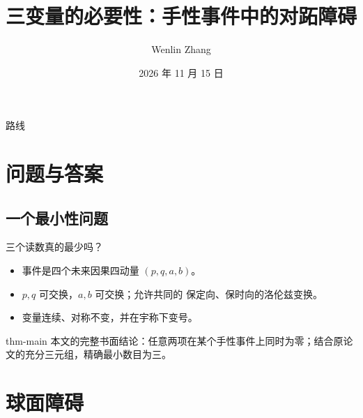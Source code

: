 \documentclass{beamer}
\title{三变量的必要性：手性事件中的对跖障碍}
\author{Wenlin Zhang}
\institute{National University of Singapore 与 Chrono AI，新加坡}
\date{2026 年 11 月 15 日}
\begin{document}
\begin{frame}
  \titlepage
\end{frame}
\begin{frame}{路线}
  \tableofcontents
\end{frame}
\section{问题与答案}
\subsection{一个最小性问题}
\begin{frame}{三个读数真的最少吗？}
  \begin{itemize}
    \item 事件是四个未来因果四动量 $(p,q,a,b)$。
    \item $p,q$ 可交换，$a,b$ 可交换；允许共同的 保定向、保时向的洛伦兹变换。
    \item 变量连续、对称不变，并在宇称下变号。
  \end{itemize}
  \begin{bookresult}{thm-main}
    本文的完整书面结论：任意两项在某个手性事件上同时为零；结合原论文的充分三元组，精确最小数目为三。
  \end{bookresult}
\end{frame}
\section{球面障碍}
\end{document}

